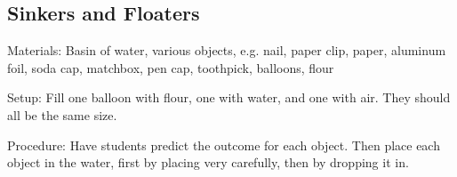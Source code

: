 \begin{multicols}{2}
\vfill
\columnbreak

\subsection{Sinkers and Floaters}


\begin{description*}
\item[Materials:]{Basin of water, various objects, e.g. nail, paper clip, paper, aluminum foil, soda cap, matchbox, pen cap, toothpick, balloons, flour}
\item[Setup:]{Fill one balloon with flour, one with water, and one with air. They should all be the same size.}
\item[Procedure:]{Have students predict the outcome for each object. Then place each object in the water, first by placing very carefully, then by dropping it in.}
\end{description*}


\end{multicols}
